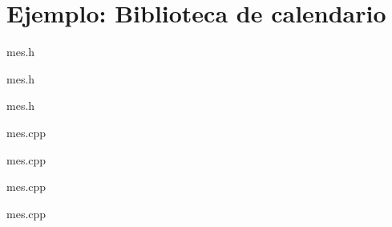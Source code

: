 \section{Ejemplo: Biblioteca de calendario}

 {

\begin{frame}
\begin{block}{mes.h}

\end{block}
\end{frame}

\begin{frame}
\begin{block}{mes.h}

\end{block}
\end{frame}

}

 {
\begin{frame}
\begin{block}{mes.h}

\end{block}
\end{frame}
}

 {

\begin{frame}
\begin{block}{mes.cpp}

\end{block}
\end{frame}

\begin{frame}
\begin{block}{mes.cpp}

\end{block}
\end{frame}

\begin{frame}
\begin{block}{mes.cpp}

\end{block}
\end{frame}

}

 {

\begin{frame}
\begin{block}{mes.cpp}

\end{block}
\end{frame}

}

